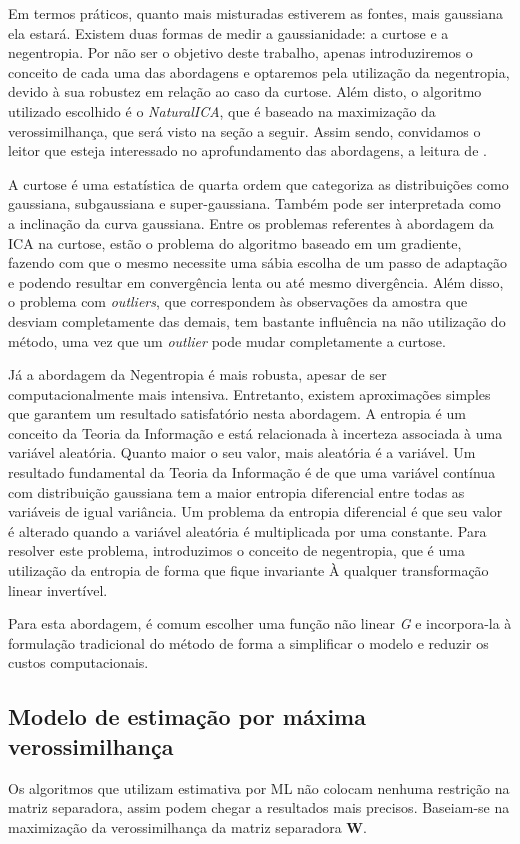     \medskip
    
    Em termos práticos, quanto mais misturadas estiverem as fontes, mais gaussiana ela estará. Existem duas formas de medir a gaussianidade: a curtose e a negentropia. Por não ser o objetivo deste trabalho, apenas introduziremos o conceito de cada uma das abordagens e optaremos pela utilização da negentropia, devido à sua robustez em relação ao caso da curtose. Além disto, o algoritmo utilizado escolhido é o \textit{NaturalICA}, que é baseado na maximização da verossimilhança, que será visto na seção a seguir. Assim sendo, convidamos o leitor que esteja interessado no aprofundamento das abordagens, a leitura de \cite{LuizVictorio}.
    
    A curtose é uma estatística de quarta ordem que categoriza as distribuições como gaussiana, subgaussiana e super-gaussiana. Também pode ser interpretada como a inclinação da curva gaussiana. Entre os problemas referentes à abordagem da ICA na curtose, estão o problema do algoritmo baseado em um gradiente, fazendo com que o mesmo necessite uma sábia escolha de um passo de adaptação e podendo resultar em convergência lenta ou até mesmo divergência. Além disso, o problema com \textit{outliers}, que correspondem às observações da amostra que desviam completamente das demais, tem bastante influência na não utilização do método, uma vez que um \textit{outlier} pode mudar completamente a curtose.
    
    Já a abordagem da Negentropia é mais robusta, apesar de ser computacionalmente mais intensiva. Entretanto, existem aproximações simples que garantem um resultado satisfatório nesta abordagem. A entropia é um conceito da Teoria da Informação e está relacionada à incerteza associada à uma variável aleatória. Quanto maior o seu valor, mais aleatória é a variável. Um resultado fundamental da Teoria da Informação é de que uma variável contínua com distribuição gaussiana tem a maior entropia diferencial entre todas as variáveis de igual variância. Um problema da entropia diferencial é que seu valor é alterado quando a variável aleatória é multiplicada por uma constante. Para resolver este problema, introduzimos o conceito de negentropia, que é uma utilização da entropia de forma que fique invariante À qualquer transformação linear invertível. 
    
    Para esta abordagem, é comum escolher uma função não linear \textit{G} e incorpora-la à formulação tradicional do método de forma a simplificar o modelo e reduzir os custos computacionais.
    
\subsection{Modelo de estimação por máxima verossimilhança}

Os algoritmos que utilizam estimativa por ML não colocam nenhuma restrição na matriz separadora, assim podem chegar a resultados mais precisos. Baseiam-se na maximização da verossimilhança da matriz separadora $\mathbf{W}$.
